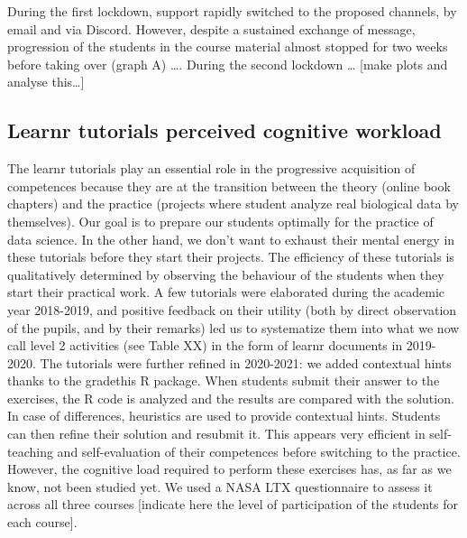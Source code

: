 \documentclass[
]{article}
\begin{document}
During the first lockdown, support rapidly switched to the proposed
channels, by email and via Discord. However, despite a sustained
exchange of message, progression of the students in the course material
almost stopped for two weeks before taking over (graph A) \ldots. During
the second lockdown \ldots{} {[}make plots and analyse this\ldots{]}

\hypertarget{learnr-tutorials-perceived-cognitive-workload}{%
\subsection{Learnr tutorials perceived cognitive
workload}\label{learnr-tutorials-perceived-cognitive-workload}}

The learnr tutorials play an essential role in the progressive
acquisition of competences because they are at the transition between
the theory (online book chapters) and the practice (projects where
student analyze real biological data by themselves). Our goal is to
prepare our students optimally for the practice of data science. In the
other hand, we don't want to exhaust their mental energy in these
tutorials before they start their projects. The efficiency of these
tutorials is qualitatively determined by observing the behaviour of the
students when they start their practical work. A few tutorials were
elaborated during the academic year 2018-2019, and positive feedback on
their utility (both by direct observation of the pupils, and by their
remarks) led us to systematize them into what we now call level 2
activities (see Table XX) in the form of learnr documents in 2019-2020.
The tutorials were further refined in 2020-2021: we added contextual
hints thanks to the gradethis R package. When students submit their
answer to the exercises, the R code is analyzed and the results are
compared with the solution. In case of differences, heuristics are used
to provide contextual hints. Students can then refine their solution and
resubmit it. This appears very efficient in self-teaching and
self-evaluation of their competences before switching to the practice.
However, the cognitive load required to perform these exercises has, as
far as we know, not been studied yet. We used a NASA LTX questionnaire
to assess it across all three courses {[}indicate here the level of
participation of the students for each course{]}.
\end{document}
